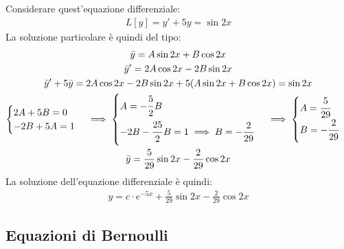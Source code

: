 \documentclass{article}
\numberwithin{equation}{subsection}
\begin{document}
Considerare quest'equazione differenziale:
\begin{gather*}
    L[y]=y'+5y=\sin2x
\end{gather*}
La soluzione particolare è quindi del tipo:
\begin{gather*}
    \bar{y}=A\sin2x+B\cos2x\\
    \bar{y}'=2A\cos2x-2B\sin2x\\
    \bar{y}'+5\bar{y}=2A\cos2x-2B\sin2x+5(A\sin2x+B\cos2x)=\sin2x\\
    \begin{cases}
        2A+5B=0\\
        -2B+5A=1
    \end{cases}\implies\begin{cases}
        A=\displaystyle-\frac{\strut5}{\strut2}B\\
        -2B-\displaystyle\frac{\strut25}{\strut2}B=1\implies B=\displaystyle-\frac{2}{29}
    \end{cases}\implies\begin{cases}
        A=\displaystyle\frac{\strut5}{29}\\
        B=\displaystyle-\frac{\strut2}{\strut29}
    \end{cases}\\
    \bar{y}=\displaystyle\frac{5}{29}\sin2x-\frac{2}{29}\cos2x
\end{gather*}
La soluzione dell'equazione differenziale è quindi:
\begin{gather*}
    y=c\cdot e^{-5x}+\displaystyle\frac{5}{29}\sin2x-\frac{2}{29}\cos2x
\end{gather*}

\subsection{Equazioni di Bernoulli}
\end{document}
